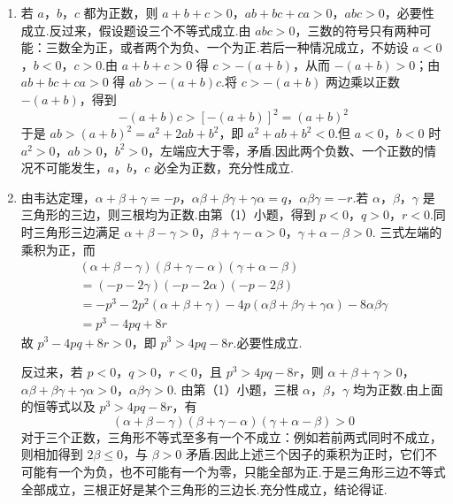 \documentclass[UTF8,a4paper,oneside,11pt]{ctexbook}
\begin{document}
\begin{solution}
\begin{enumerate}
\item 若 \(a\)，\(b\)，\(c\) 都为正数，则 \(a+b+c>0\)，\(ab+bc+ca>0\)，\(abc>0\)，必要性成立.反过来，假设题设三个不等式成立.由 \(abc>0\)，三数的符号只有两种可能：三数全为正，或者两个为负、一个为正.若后一种情况成立，不妨设 \(a<0\)，\(b<0\)，\(c>0\).由 \(a+b+c>0\) 得 \(c>-(a+b)\)，从而 \(-(a+b)>0\)；由 \(ab+bc+ca>0\) 得 \(ab>-(a+b)c\).将 \(c>-(a+b)\) 两边乘以正数 \(-(a+b)\)，得到
\[
-(a+b)c>[-(a+b)]^2=(a+b)^2
\]
于是 \(ab>(a+b)^2=a^2+2ab+b^2\)，即 \(a^2+ab+b^2<0\).但 \(a<0\)，\(b<0\) 时 \(a^2>0\)，\(ab>0\)，\(b^2>0\)，左端应大于零，矛盾.因此两个负数、一个正数的情况不可能发生，\(a\)，\(b\)，\(c\) 必全为正数，充分性成立.

\item 由韦达定理，\(\alpha+\beta+\gamma=-p\)，\(\alpha\beta+\beta\gamma+\gamma\alpha=q\)，\(\alpha\beta\gamma=-r\).若 \(\alpha\)，\(\beta\)，\(\gamma\) 是三角形的三边，则三根均为正数.由第（1）小题，得到 \(p<0\)，\(q>0\)，\(r<0\).同时三角形三边满足 \(\alpha+\beta-\gamma>0\)，\(\beta+\gamma-\alpha>0\)，\(\gamma+\alpha-\beta>0\).
三式左端的乘积为正，而
\[
\begin{gathered}
(\alpha+\beta-\gamma)(\beta+\gamma-\alpha)(\gamma+\alpha-\beta)\\
=(-p-2\gamma)(-p-2\alpha)(-p-2\beta)\\
=-p^3-2p^2(\alpha+\beta+\gamma)-4p(\alpha\beta+\beta\gamma+\gamma\alpha)-8\alpha\beta\gamma\\
=p^3-4pq+8r
\end{gathered}
\]
故 \(p^3-4pq+8r>0\)，即 \(p^3>4pq-8r\).必要性成立.

反过来，若 \(p<0\)，\(q>0\)，\(r<0\)，且 \(p^3>4pq-8r\)，则
\(\alpha+\beta+\gamma>0\)，\(\alpha\beta+\beta\gamma+\gamma\alpha>0\)，\(\alpha\beta\gamma>0\).
由第（1）小题，三根 \(\alpha\)，\(\beta\)，\(\gamma\) 均为正数.由上面的恒等式以及 \(p^3>4pq-8r\)，有
\[
(\alpha+\beta-\gamma)(\beta+\gamma-\alpha)(\gamma+\alpha-\beta)>0
\]
对于三个正数，三角形不等式至多有一个不成立：例如若前两式同时不成立，则相加得到 \(2\beta\leq0\)，与 \(\beta>0\) 矛盾.因此上述三个因子的乘积为正时，它们不可能有一个为负，也不可能有一个为零，只能全部为正.于是三角形三边不等式全部成立，三根正好是某个三角形的三边长.充分性成立，结论得证.
\end{enumerate}
\end{solution}

\end{document}
